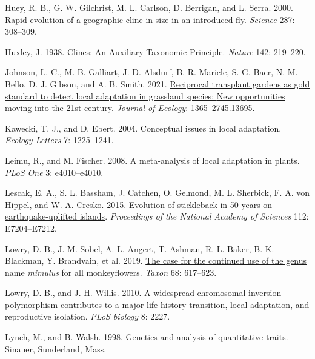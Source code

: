 \documentclass[
  12pt,
]{article}
\newlength{\cslhangindent}
\newlength{\cslentryspacingunit} %
\newenvironment{CSLReferences}[2] %
 {%
  \setlength{\parindent}{0pt}
  \ifodd #1
  \let\oldpar\par
  \def\par{\hangindent=\cslhangindent\oldpar}
  \fi
  \setlength{\parskip}{#2\cslentryspacingunit}
 }%
 {}
\begin{document}
\begin{CSLReferences}{1}{0}
\leavevmode{}%
Huey, R. B., G. W. Gilchrist, M. L. Carlson, D. Berrigan, and L. Serra. 2000. Rapid evolution of a geographic cline in size in an introduced fly. \emph{Science} 287: 308--309.

\leavevmode{}%
Huxley, J. 1938. \href{https://doi.org/10.1038/142219a0}{Clines: An {Auxiliary} {Taxonomic} {Principle}}. \emph{Nature} 142: 219--220.

\leavevmode{}%
Johnson, L. C., M. B. Galliart, J. D. Alsdurf, B. R. Maricle, S. G. Baer, N. M. Bello, D. J. Gibson, and A. B. Smith. 2021. \href{https://doi.org/10.1111/1365-2745.13695}{Reciprocal transplant gardens as gold standard to detect local adaptation in grassland species: {New} opportunities moving into the 21st century}. \emph{Journal of Ecology}: 1365--2745.13695.

\leavevmode{}%
Kawecki, T. J., and D. Ebert. 2004. Conceptual issues in local adaptation. \emph{Ecology Letters} 7: 1225--1241.

\leavevmode{}%
Leimu, R., and M. Fischer. 2008. A meta-analysis of local adaptation in plants. \emph{PLoS One} 3: e4010--e4010.

\leavevmode{}%
Lescak, E. A., S. L. Bassham, J. Catchen, O. Gelmond, M. L. Sherbick, F. A. von Hippel, and W. A. Cresko. 2015. \href{https://doi.org/10.1073/pnas.1512020112}{Evolution of stickleback in 50 years on earthquake-uplifted islands}. \emph{Proceedings of the National Academy of Sciences} 112: E7204--E7212.

\leavevmode{}%
Lowry, D. B., J. M. Sobel, A. L. Angert, T. Ashman, R. L. Baker, B. K. Blackman, Y. Brandvain, et al. 2019. \href{https://doi.org/10.1002/tax.12122}{The case for the continued use of the genus name \emph{mimulus} for all monkeyflowers}. \emph{Taxon} 68: 617--623.

\leavevmode{}%
Lowry, D. B., and J. H. Willis. 2010. A widespread chromosomal inversion polymorphism contributes to a major life-history transition, local adaptation, and reproductive isolation. \emph{PLoS biology} 8: 2227.

\leavevmode{}%
Lynch, M., and B. Walsh. 1998. Genetics and analysis of quantitative traits. Sinauer, Sunderland, Mass.


\end{CSLReferences}
\end{document}

